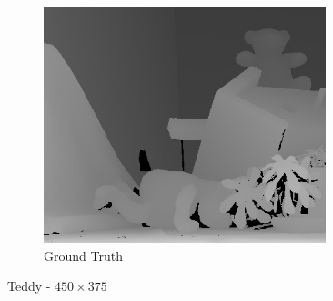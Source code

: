 \begin{figure}[ht]
\begin{subfigure}[t]{0.3\textwidth}
    \centering\includegraphics[width=0.9\textwidth]{figures/ted_gt}
    \caption{Ground Truth\label{fig:apted_gt}}
  \end{subfigure}
  \caption{Teddy - $450\times375$ \cite{Scharstein2003}\label{fig:apted}}
\end{figure}

